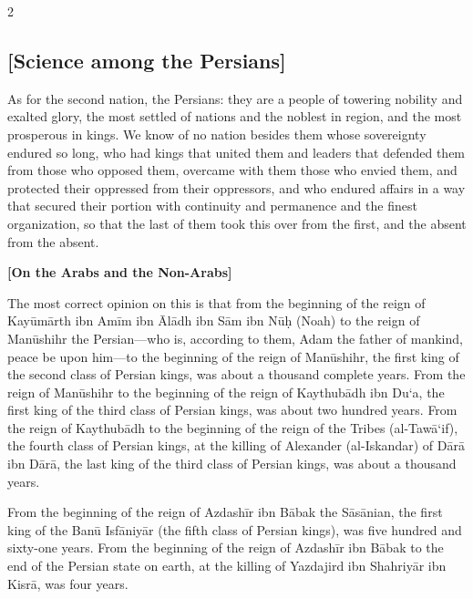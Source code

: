 \documentclass[11pt,a4paper]{article}
\begin{document}
\begin{paracol}{2}
\begin{rightcolumn}
\subsection*{[Science among the Persians]}
\vspace{0.3cm}
As for the second nation, the Persians: they are a people of towering nobility and exalted glory, the most settled of nations and the noblest in region, and the most prosperous in kings. We know of no nation besides them whose sovereignty endured so long, who had kings that united them and leaders that defended them from those who opposed them, overcame with them those who envied them, and protected their oppressed from their oppressors, and who endured affairs in a way that secured their portion with continuity and permanence and the finest organization, so that the last of them took this over from the first, and the absent from the absent.

\vspace{0.4cm}
\textbf{[On the Arabs and the Non-Arabs]}

\vspace{0.3cm}
The most correct opinion on this is that from the beginning of the reign of Kay\={u}m\={a}rth ibn Am\={i}m ibn \={A}l\={a}dh ibn S\={a}m ibn N\={u}\d{h} (Noah) to the reign of Man\={u}shihr the Persian---who is, according to them, Adam the father of mankind, peace be upon him---to the beginning of the reign of Man\={u}shihr, the first king of the second class of Persian kings, was about a thousand complete years. From the reign of Man\={u}shihr to the beginning of the reign of Kaythub\={a}dh ibn Du\textquoteleft a, the first king of the third class of Persian kings, was about two hundred years. From the reign of Kaythub\={a}dh to the beginning of the reign of the Tribes (al-\-Taw\={a}\textquoteleft if), the fourth class of Persian kings, at the killing of Alexander (al-Iskandar) of D\={a}r\={a} ibn D\={a}r\={a}, the last king of the third class of Persian kings, was about a thousand years.

\vspace{0.3cm}
From the beginning of the reign of Azdash\={i}r ibn B\={a}bak the S\={a}s\={a}nian, the first king of the Ban\={u} Isf\={a}niy\={a}r (the fifth class of Persian kings), was five hundred and sixty-one years. From the beginning of the reign of Azdash\={i}r ibn B\={a}bak to the end of the Persian state on earth, at the killing of Yazdajird ibn Shahriy\={a}r ibn Kisr\={a}, was four years.
\end{rightcolumn}

\end{paracol}
\end{document}
